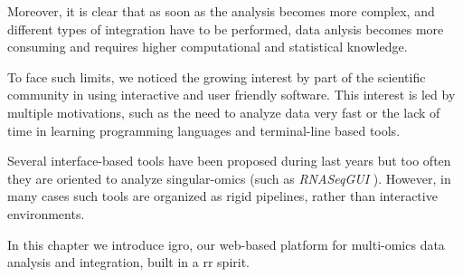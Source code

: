 Moreover, it is clear that as soon as the analysis becomes more complex, and different types of integration have to be performed, data anlysis becomes more consuming and requires higher computational and statistical knowledge.


To face such limits, we noticed the growing interest by part of the scientific community in using interactive and user friendly software.
This interest is led by multiple motivations, such as the need to analyze data very fast or the lack of time in learning programming languages and terminal-line based tools.

Several interface-based tools \cite{Poplawski2016} have been proposed during last years but too often they are oriented to analyze singular-omics (such as \textit{RNASeqGUI} \cite{russo2015advantages}).
However, in many cases such tools are organized as rigid pipelines, rather than interactive environments.

In this chapter we introduce \gls{igro}, our web-based platform for multi-omics data analysis and integration, built in a \gls{rr} spirit.


%
%
%
%


